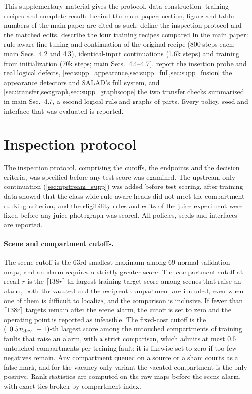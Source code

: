 \clearpage
\setcounter{page}{1}
\maketitlesupplementary

\appendix
\noindent This supplementary material gives the protocol, data construction, training recipes and complete results behind the main paper; section, figure and table numbers of the main paper are cited as such.  define the inspection protocol and the matched edits.  describe the four training recipes compared in the main paper: rule-aware fine-tuning and continuation of the original recipe (800 steps each; main Secs.~4.2 and 4.3), identical-input continuations (1.6k steps) and training from initialization (70k steps; main Secs.~4.4--4.7).  report the insertion probe and real logical defects, \cref{sec:supp_appearance,sec:supp_full,sec:supp_fusion} the appearance detectors and SALAD's full system, and \cref{sec:transfer,sec:graph,sec:supp_graphscope} the two transfer checks summarized in main Sec.~4.7, a second logical rule and graphs of parts. Every policy, seed and interface that was evaluated is reported.

\section{Inspection protocol}
\label{sec:supp_protocol}
The inspection protocol, comprising the cutoffs, the endpoints and the decision criteria, was specified before any test score was examined. The upstream-only continuation (\cref{sec:upstream_supp}) was added before test scoring, after training data showed that the class-wide rule-aware heads did not meet the compartment-ranking criterion, and the eligibility rules and edits of the juice experiment were fixed before any juice photograph was scored. All policies, seeds and interfaces are reported.

\paragraph{Scene and compartment cutoffs.}
The scene cutoff is the 63rd smallest maximum among 69 normal validation maps, and an alarm requires a strictly greater score. The compartment cutoff at recall $r$ is the $\lceil 138r\rceil$-th largest training target score among scenes that raise an alarm; both the vacated and the recipient compartment are included, even when one of them is difficult to localize, and the comparison is inclusive. If fewer than $\lceil 138r\rceil$ targets remain after the scene alarm, the cutoff is set to zero and the operating point is reported as infeasible. The fixed-cost cutoff is the $(\lfloor0.5\,n_{\rm dev}\rfloor+1)$-th largest score among the untouched compartments of training faults that raise an alarm, with a strict comparison, which admits at most 0.5 untouched compartments per training fault; it is likewise set to zero if too few negatives remain. Any compartment queued on a source or a sham counts as a false mark, and for the vacancy-only variant the vacated compartment is the only positive. Rank statistics are computed on the raw maps before the scene alarm, with exact ties broken by compartment index.

